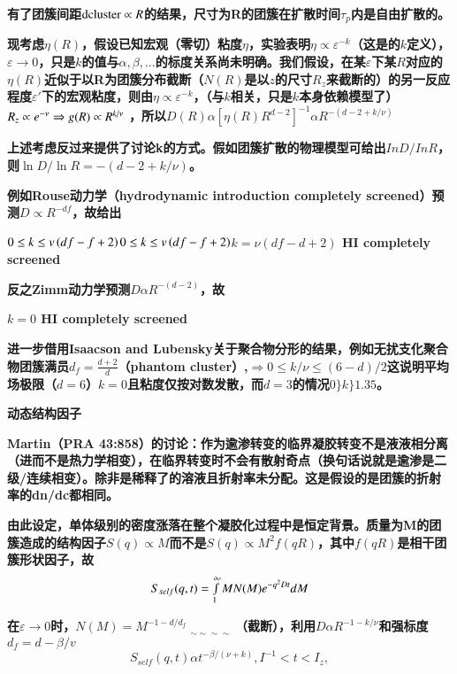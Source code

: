 \documentclass{article} %
\begin{document}
\noindent 
{\bf 有了团簇间距${\rm dcluster}\propto R$的结果，尺寸为R的团簇在扩散时间$\tau _{p} $内是自由扩散的。}


{\bf  现考虑$\eta \left(R\right)$，假设已知宏观（零切）粘度$\eta $，实验表明$\eta \propto \varepsilon ^{-k} $（这是的$k$定义），$\varepsilon \to 0$，只是$k$的值与$\alpha ,\beta ,...$的标度关系尚未明确。我们假设，在某$\varepsilon $下某$R$对应的$\eta \left(R\right)$近似于以R为团簇分布截断（$N\left(R\right)$是以$z$的尺寸$R_{z} $来截断的）的另一反应程度$\varepsilon '$下的宏观粘度，则由$\eta \propto \varepsilon ^{-k} $，（与$k$相关，只是$k$本身依赖模型了）$R_{z} \propto e^{-\nu } \Rightarrow g(R)\propto R^{{k\mathord{\left/ {\vphantom {k \nu }} \right. \kern-\nulldelimiterspace} \nu } } $ ，所以$D(R)\alpha [\eta (R)R^{d-2} ]^{-1} \alpha R^{-(d-2+k/\nu )} $}


{\bf  上述考虑反过来提供了讨论k的方式。假如团簇扩散的物理模型可给出$InD/InR$，则$\ln D/\ln R=-(d-2+k/\nu )$。}

\noindent 
{\bf 例如Rouse动力学（hydrodynamic introduction completely screened）预测$D\propto R^{-df} $，故给出}

\noindent 
{\bf ${\rm 0}\le k\le v\left(df-f+2\right)$${\rm 0}\le k\le v\left(df-f+2\right)$$k=\nu (df-d+2)$  HI completely screened                  }

\noindent 
{\bf 反之Zimm动力学预测$D\alpha R^{-(d-2)} $，故  }

\noindent 
{\bf $k=0$  HI completely screened}

\noindent 
{\bf 进一步借用Isaacson and Lubensky关于聚合物分形的结果，例如无扰支化聚合物团簇满员$d_{f} =\frac{d+2}{d} $（phantom cluster）,$\Rightarrow 0\le k/\nu \le (6-d)/2$这说明平均场极限（$d=6$）$k=0$且粘度仅按对数发散，而$d=3$的情况$0\mathrm{\} }k\mathrm{\} }1.35$。 }


{\bf  动态结构因子}


{\bf  Martin（PRA 43:858）的讨论：作为逾渗转变的临界凝胶转变不是液液相分离（进而不是热力学相变），在临界转变时不会有散射奇点（换句话说就是逾渗是二级/连续相变）。除非是稀释了的溶液且折射率未分配。这是假设的是团簇的折射率的dn/dc都相同。}


{\bf  由此设定，单体级别的密度涨落在整个凝胶化过程中是恒定背景。质量为M的团簇造成的结构因子$S(q)\propto M$而不是$S(q)\propto M^{2} f(qR)$，其中$f(qR)$是相干团簇形状因子，故
\[S_{self} (q,t)=\smallint _{1}^{\infty } MN(M)e^{-q^{2} Dt} dM\] }

{\bf 在$\varepsilon \to 0$时，$N(M)=M^{-1-d/d_{f} } {\mathop{e^{-M/M_{z} } }\limits_{\mathrm{\sim \sim \sim \sim }}} $（截断），利用$D\alpha R^{-1-k/\nu } $和强标度$d_{f} =d-\beta /v$
\[S_{self} (q,t)\alpha t^{-\beta /(\nu +k)} ,I^{-1} <t<I_{z} ,\] }
\end{document}
